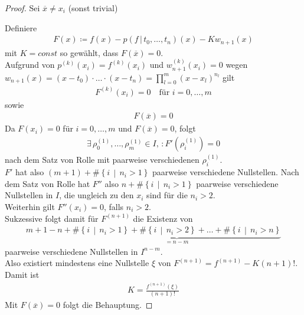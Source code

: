 \begin{proof}
  Sei $\overline{x}\neq x_i$ (sonst trivial)
  \label{im6.1.18}


  Definiere
  \begin{gather}
    F(x) \coloneqq f(x)-p(f\,|\, t_0,\dots , t_n)(x) - Kw_{n+1}(x)
    \label{IV.1.22}
  \end{gather}
  mit $K=const$ so gewählt, dass $F(\overline{x})=0$.\\
  Aufgrund von $p^{(k)}(x_i)=f^{(k)}(x_i)$
  und $w_{n+1}^{(k)}(x_i) = 0$ wegen
  $w_{n+1}(x) =
  (x-t_0)\cdot\dots\cdot(x-t_n)=\prod_{l=0}^{m}(x-x_l)^{n_l}$
  gilt
  \begin{gather*}
    F^{(k)}(x_i) = 0 
    \quad \text{für } i=0,\dots,m 
  \end{gather*}
  sowie
  \begin{gather*}
    F(\overline{x})=0
  \end{gather*}
  Da $F(x_i)=0$ für $i=0,\dots,m$ und $F(\overline{x})=0$, folgt
  \begin{gather*}
    \exists\, \rho_0^{(1)},\dots,\rho_m^{(1)}\in I,\,
    : F'(\rho_i^{(1)})=0
  \end{gather*}
  nach dem Satz von Rolle 
  mit paarweise verschiedenen $\rho_i^{(1)}$. \\
  $F'$ hat also $(m+1)+\#\left\{i\,\middle\vert\, n_i>1\right\}$
  paarweise verschiedene Nullstellen.
  Nach dem Satz von Rolle hat $F''$ also 
  $n+\#\left\{i\,\middle\vert\, n_i>1\right\}$
  paarweise verschiedene Nullstellen in $I$,
  die ungleich zu den $x_i$ sind für die $n_i>2$.\\
  Weiterhin gilt $F''(x_i)=0$, falls $n_i>2$.\\
  Sukzessive folgt damit für $F^{(n+1)}$ die Existenz von
  \begin{gather*}
    m+1-n + \underbrace{
      \#\left\{i\,\middle\vert\, n_i>1\right\}
      + \#\left\{i\,\middle\vert\, n_i>2\right\}
      + \dots 
      + \#\left\{i\,\middle\vert\, n_i>n\right\}
    }_{=n-m}
  \end{gather*}
  paarweise verschiedene Nullstellen in $I^{n-m}$.\\
  Also existiert mindestens eine Nullstelle $\xi$ von
  $F^{(n+1)}=f^{(n+1)}-K(n+1)!$. Damit ist
  \begin{gather*}
    K=\frac{f^{(n+1)}(\xi)}{(n+1)!}
  \end{gather*}
  Mit $F(\overline{x}) =0$ folgt die Behauptung.
\end{proof}


